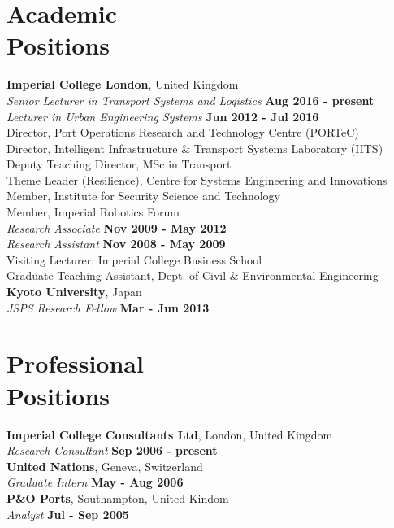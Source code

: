 \documentclass[margin]{res}
\newcommand\tab[1][1cm]{\hspace*{#1}}
\begin{document}
\begin{resume}
\section{\sc Academic\\ Positions}
	{\bf Imperial College London}, United Kingdom \\
		\tab[0.2in] \textit{Senior Lecturer in Transport Systems and Logistics} \hfill {\bf Aug 2016 - present}\\
		\tab[0.2in] \textit{Lecturer in Urban Engineering Systems} \hfill {\bf Jun 2012 - Jul 2016}\\
			\tab[0.4in] Director, Port Operations Research and Technology Centre (PORTeC) \\
			\tab[0.4in] Director, Intelligent Infrastructure \& Transport Systems Laboratory (IITS) \\
			\tab[0.4in] Deputy Teaching Director, MSc in Transport \\
			\tab[0.4in] Theme Leader (Resilience), Centre for Systems Engineering and Innovations \\
			\tab[0.4in] Member, Institute for Security Science and Technology \\
			\tab[0.4in] Member, Imperial Robotics Forum \\
		\tab[0.2in] \textit{Research Associate} \hfill {\bf Nov 2009 - May 2012}\\
		\tab[0.2in] \textit{Research Assistant} \hfill {\bf Nov 2008 - May 2009}\\
			\tab[0.4in] Visiting Lecturer, Imperial College Business School \\
			\tab[0.4in] Graduate Teaching Assistant, Dept. of Civil \& Environmental Engineering \\
	{\bf Kyoto University}, Japan \\
		\tab[0.2in] \textit{JSPS Research Fellow} \hfill {\bf Mar - Jun 2013}\\

\vspace{-0.20in}
\section{\sc Professional\\ Positions}
	{\bf Imperial College Consultants Ltd}, London, United Kingdom \\
		\tab[0.2in] \textit{Research Consultant} \hfill {\bf Sep 2006 - present}\\
	{\bf United Nations}, Geneva, Switzerland \\
		\tab[0.2in] \textit{Graduate Intern} \hfill {\bf May - Aug 2006}\\
	{\bf P\&O Ports}, Southampton, United Kindom \\
		\tab[0.2in] \textit{Analyst} \hfill {\bf Jul - Sep 2005}\\


\end{resume}
\end{document}
